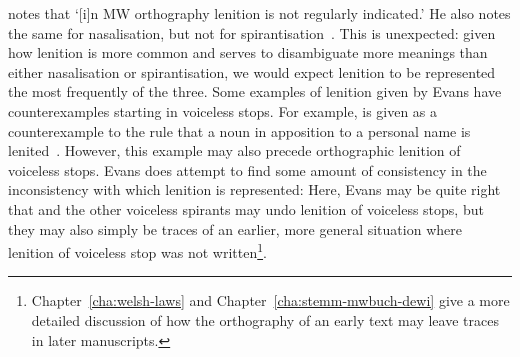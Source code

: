 \Textcite[\S 18]{evans_grammar_1964} notes that `[i]n MW orthography lenition is not regularly indicated.' He also notes the same for nasalisation, but not for spirantisation~\autocite[\S\S 24--25]{evans_grammar_1964}. This is unexpected: given how lenition is  more common and serves to disambiguate more meanings than either nasalisation or spirantisation, we would expect lenition to be represented the most frequently of the three. Some examples of lenition given by Evans have counterexamples starting in voiceless stops. For example,  is given as a counterexample to the rule that a noun in apposition to a personal name is lenited~\autocite[\S 19]{evans_grammar_1964}. However, this example may also precede orthographic lenition of voiceless stops. Evans does attempt to find some amount of consistency in the inconsistency with which lenition is represented:
Here, Evans may be quite right that  and the other voiceless spirants may undo lenition of voiceless stops, but they may also simply be traces of an earlier, more general situation where lenition of voiceless stop was not written\footnote{Chapter~\ref{cha:welsh-laws} and Chapter~\ref{cha:stemm-mwbuch-dewi} give a more detailed discussion of how the orthography of an early text may leave traces in later manuscripts.}.

